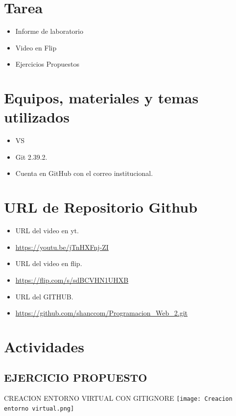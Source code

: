 \documentclass{article}
\begin{document}
	\section{Tarea}
	\begin{itemize}		
		\item Informe de laboratorio
            \item Video en Flip
		\item Ejercicios Propuestos
        
	\end{itemize}
		
	\section{Equipos, materiales y temas utilizados}
	\begin{itemize}
		\item VS
		\item Git 2.39.2.
		\item Cuenta en GitHub con el correo institucional.
	\end{itemize}
    \clearpage
    
	\section{URL de Repositorio Github}
	\begin{itemize}
        \item URL del video en yt.
		\item \url{https://youtu.be/jTnHXFnj-ZI}
        \item URL del video en flip.
		\item \url{https://flip.com/s/sdBCVHN1UHXB}
        \item URL del GITHUB.
            \item \url{https://github.com/shanccom/Programacion_Web_2.git}
	\end{itemize}
	
	\section{Actividades}
	\subsection{EJERCICIO PROPUESTO}
        \item CREACION ENTORNO VIRTUAL CON GITIGNORE
        \newline \newline
        \texttt{[image: Creacion entorno virtual.png]}
\end{document}
